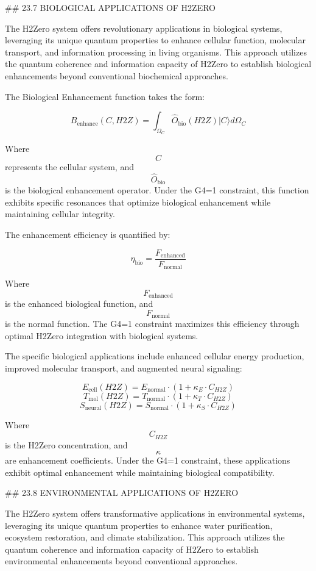 ## 23.7 BIOLOGICAL APPLICATIONS OF H2ZERO

The H2Zero system offers revolutionary applications in biological systems, leveraging its unique quantum properties to enhance cellular function, molecular transport, and information processing in living organisms. This approach utilizes the quantum coherence and information capacity of H2Zero to establish biological enhancements beyond conventional biochemical approaches.

The Biological Enhancement function takes the form:

$$ B_{\text{enhance}}(C, H2Z) = \int_{\Omega_C} \hat{O}_{\text{bio}}(H2Z) |C\rangle d\Omega_C $$

Where $$ C $$ represents the cellular system, and $$ \hat{O}_{\text{bio}} $$ is the biological enhancement operator. Under the G4=1 constraint, this function exhibits specific resonances that optimize biological enhancement while maintaining cellular integrity.

The enhancement efficiency is quantified by:

$$ \eta_{\text{bio}} = \frac{F_{\text{enhanced}}}{F_{\text{normal}}} $$

Where $$ F_{\text{enhanced}} $$ is the enhanced biological function, and $$ F_{\text{normal}} $$ is the normal function. The G4=1 constraint maximizes this efficiency through optimal H2Zero integration with biological systems.

The specific biological applications include enhanced cellular energy production, improved molecular transport, and augmented neural signaling:

$$ E_{\text{cell}}(H2Z) = E_{\text{normal}} \cdot (1 + \kappa_{E} \cdot C_{H2Z}) $$
$$ T_{\text{mol}}(H2Z) = T_{\text{normal}} \cdot (1 + \kappa_{T} \cdot C_{H2Z}) $$
$$ S_{\text{neural}}(H2Z) = S_{\text{normal}} \cdot (1 + \kappa_{S} \cdot C_{H2Z}) $$

Where $$ C_{H2Z} $$ is the H2Zero concentration, and $$ \kappa $$ are enhancement coefficients. Under the G4=1 constraint, these applications exhibit optimal enhancement while maintaining biological compatibility.

## 23.8 ENVIRONMENTAL APPLICATIONS OF H2ZERO

The H2Zero system offers transformative applications in environmental systems, leveraging its unique quantum properties to enhance water purification, ecosystem restoration, and climate stabilization. This approach utilizes the quantum coherence and information capacity of H2Zero to establish environmental enhancements beyond conventional approaches.

